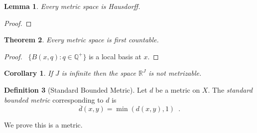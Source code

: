 \documentclass{report}
\let\qed\relax
\newtheorem{lm}{Lemma}[section]
\newtheorem{thm}[lm]{Theorem}
\newtheorem{cor}{Corollary}[lm]
\theoremstyle{definition}
\newtheorem{df}[lm]{Definition}
\begin{document}
  \begin{lm}
    Every metric space is Hausdorff.
  \end{lm}

  \begin{proof}
    \pf
    \qed
  \end{proof}

  \begin{thm}
    Every metric space is first countable.
  \end{thm}

  \begin{proof}
    \pf\ $\{ B(x, q) : q \in \mathbb{Q}^+ \}$ is a local basis at $x$. \qed
  \end{proof}

  \begin{cor}
  	If $J$ is infinite then the space $\mathbb{R}^J$ is not metrizable.
  \end{cor}

  \begin{df}[Standard Bounded Metric]
    Let $d$ be a metric on $X$. The \emph{standard bounded metric}
    corresponding to $d$ is
    \[ \overline{d}(x, y) = \min(d(x, y), 1) \enspace . \]

    We prove this is a metric.
  \end{df}
\end{document}
